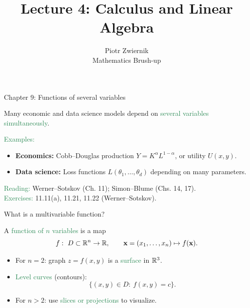 \documentclass[11pt,aspectratio=169]{beamer}
\title[Calculus and Linear Algebra]{Lecture 4: Calculus and Linear Algebra}
\author[Piotr Zwiernik]{Piotr Zwiernik\\Mathematics Brush-up}
\institute[Barcelona School of Economics]{Barcelona School of Economics}
\date{}
\begin{document}
\begin{frame}
  \titlepage
\end{frame}

\begin{frame}{Chapter 9: Functions of several variables}

\begin{Large}
Many economic and data science models depend on \textcolor{SeaGreen}{several variables simultaneously}.
\end{Large}

\vskip 10pt
\textcolor{SeaGreen}{Examples:}
\begin{itemize}
\item \textbf{Economics:} Cobb--Douglas production $Y=K^\alpha L^{1-\alpha}$, or utility $U(x,y)$.
\item \textbf{Data science:} Loss functions $L(\theta_1,\ldots,\theta_d)$ depending on many parameters.
\end{itemize}

\vskip 8pt
\textcolor{SeaGreen}{Reading:} Werner--Sotskov (Ch. 11); Simon--Blume (Chs. 14, 17).\\
\textcolor{SeaGreen}{Exercises:} 11.11(a), 11.21, 11.22 (Werner--Sotskov).
\end{frame}

\begin{frame}{What is a multivariable function?}

A \textcolor{SeaGreen}{function of $n$ variables} is a map
\[
f:\ D \subset \mathbb R^n \to \mathbb R, 
\qquad \mathbf{x}=(x_1,\dots,x_n)\mapsto f(\mathbf{x}).
\]

\begin{itemize}
\item For $n=2$: graph $z=f(x,y)$ is a \textcolor{SeaGreen}{surface} in $\mathbb R^3$.
\item \textcolor{SeaGreen}{Level curves} (contours): 
\[
\{(x,y)\in D:\ f(x,y)=c\}.
\]
\item For $n>2$: use \textcolor{SeaGreen}{slices or projections} to visualize.
\end{itemize}
\end{frame}
\end{document}
